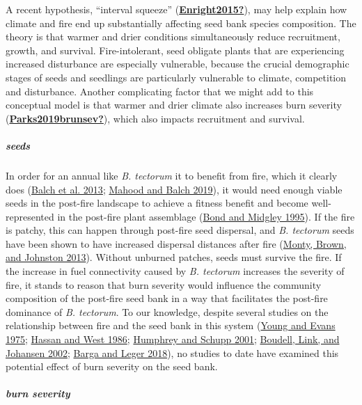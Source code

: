 \documentclass[
  12pt,
]{article}
\begin{document}
A recent hypothesis, ``interval squeeze''
(\protect\hyperlink{ref-Enright2015}{\textbf{Enright2015?}}), may help
explain how climate and fire end up substantially affecting seed bank
species composition. The theory is that warmer and drier conditions
simultaneously reduce recruitment, growth, and survival.
Fire-intolerant, seed obligate plants that are experiencing increased
disturbance are especially vulnerable, because the crucial demographic
stages of seeds and seedlings are particularly vulnerable to climate,
competition and disturbance. Another complicating factor that we might
add to this conceptual model is that warmer and drier climate also
increases burn severity
(\protect\hyperlink{ref-Parks2019brunsev}{\textbf{Parks2019brunsev?}}),
which also impacts recruitment and survival.

\hypertarget{seeds}{%
\subparagraph{seeds}\label{seeds}}

In order for an annual like \emph{B. tectorum} it to benefit from fire,
which it clearly does (\protect\hyperlink{ref-Balch2013}{Balch et al.
2013}; \protect\hyperlink{ref-Mahood2019}{Mahood and Balch 2019}), it
would need enough viable seeds in the post-fire landscape to achieve a
fitness benefit and become well-represented in the post-fire plant
assemblage (\protect\hyperlink{ref-Bond1995}{Bond and Midgley 1995}). If
the fire is patchy, this can happen through post-fire seed dispersal,
and \emph{B. tectorum} seeds have been shown to have increased dispersal
distances after fire (\protect\hyperlink{ref-Monty2013}{Monty, Brown,
and Johnston 2013}). Without unburned patches, seeds must survive the
fire. If the increase in fuel connectivity caused by \emph{B. tectorum}
increases the severity of fire, it stands to reason that burn severity
would influence the community composition of the post-fire seed bank in
a way that facilitates the post-fire dominance of \emph{B. tectorum}. To
our knowledge, despite several studies on the relationship between fire
and the seed bank in this system
(\protect\hyperlink{ref-Young1975}{Young and Evans 1975};
\protect\hyperlink{ref-Hassan1986}{Hassan and West 1986};
\protect\hyperlink{ref-Humphrey2001}{Humphrey and Schupp 2001};
\protect\hyperlink{ref-Boudell2002}{Boudell, Link, and Johansen 2002};
\protect\hyperlink{ref-Barga2018}{Barga and Leger 2018}), no studies to
date have examined this potential effect of burn severity on the seed
bank.

\hypertarget{burn-severity}{%
\subparagraph{burn severity}\label{burn-severity}}
\end{document}
